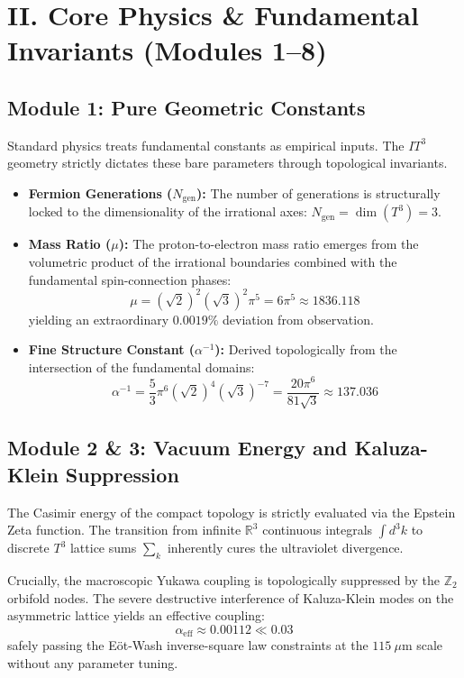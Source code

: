 \documentclass[aps,prd,twocolumn,superscriptaddress,nofootinbib]{revtex4-2}
\begin{document}
\section{II. Core Physics \& Fundamental Invariants (Modules 1--8)}

\subsection{Module 1: Pure Geometric Constants}
Standard physics treats fundamental constants as empirical inputs. The $IT^3$ geometry strictly dictates these bare parameters through topological invariants.
\begin{itemize}
    \item \textbf{Fermion Generations ($N_{\text{gen}}$):} The number of generations is structurally locked to the dimensionality of the irrational axes: $N_{\text{gen}} = \dim(T^3) = 3$.
    \item \textbf{Mass Ratio ($\mu$):} The proton-to-electron mass ratio emerges from the volumetric product of the irrational boundaries combined with the fundamental spin-connection phases: 
    \begin{equation}
        \mu = (\sqrt{2})^2 (\sqrt{3})^2 \pi^5 = 6\pi^5 \approx 1836.118
    \end{equation}
    yielding an extraordinary $0.0019\%$ deviation from observation.
    \item \textbf{Fine Structure Constant ($\alpha^{-1}$):} Derived topologically from the intersection of the fundamental domains:
    \begin{equation}
        \alpha^{-1} = \frac{5}{3} \pi^6 (\sqrt{2})^4 (\sqrt{3})^{-7} = \frac{20\pi^6}{81\sqrt{3}} \approx 137.036
    \end{equation}
\end{itemize}

\subsection{Module 2 \& 3: Vacuum Energy and Kaluza-Klein Suppression}
The Casimir energy of the compact topology is strictly evaluated via the Epstein Zeta function. The transition from infinite $\mathbb{R}^3$ continuous integrals $\int d^3k$ to discrete $T^3$ lattice sums $\sum_k$ inherently cures the ultraviolet divergence. 

Crucially, the macroscopic Yukawa coupling is topologically suppressed by the $\mathbb{Z}_2$ orbifold nodes. The severe destructive interference of Kaluza-Klein modes on the asymmetric lattice yields an effective coupling:
\begin{equation}
    \alpha_{\text{eff}} \approx 0.00112 \ll 0.03
\end{equation}
safely passing the E\"ot-Wash inverse-square law constraints at the $115~\mu\text{m}$ scale without any parameter tuning.
\end{document}
